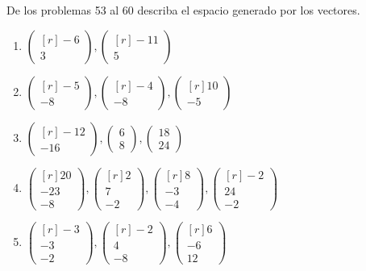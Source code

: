 De los problemas 53 al 60 describa el espacio generado por los vectores.
\begin{enumerate}[resume]
    \item $\begin{pmatrix*}[r] -6 \\ 3 \end{pmatrix*}, \begin{pmatrix*}[r] -11 \\ 5 \end{pmatrix*}$
    \item $\begin{pmatrix*}[r] -5 \\ -8 \end{pmatrix*}, \begin{pmatrix*}[r] -4 \\ -8 \end{pmatrix*}, \begin{pmatrix*}[r] 10 \\ -5 \end{pmatrix*}$
    \item $\begin{pmatrix*}[r] -12 \\ -16 \end{pmatrix*}, \begin{pmatrix} 6 \\ 8 \end{pmatrix}, \begin{pmatrix} 18 \\ 24 \end{pmatrix}$
    \item $\begin{pmatrix*}[r] 20 \\ -23 \\ -8 \end{pmatrix*}, \begin{pmatrix*}[r] 2 \\ 7 \\ -2 \end{pmatrix*}, \begin{pmatrix*}[r] 8 \\ -3 \\ -4 \end{pmatrix*}, \begin{pmatrix*}[r] -2 \\ 24 \\ -2 \end{pmatrix*}$
    \item $\begin{pmatrix*}[r] -3 \\ -3 \\ -2 \end{pmatrix*}, \begin{pmatrix*}[r] -2 \\ 4 \\ -8 \end{pmatrix*}, \begin{pmatrix*}[r] 6 \\ -6 \\ 12 \end{pmatrix*}$

\end{enumerate}
